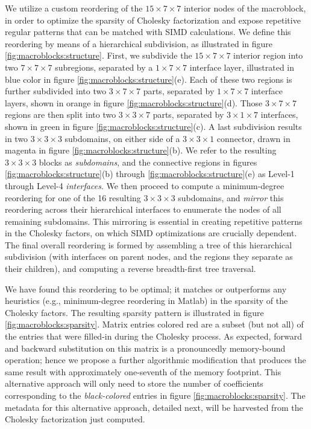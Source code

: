 We utilize a custom reordering of the $15\times 7\times 7$ interior
nodes of the macroblock, in order to optimize the sparsity of Cholesky
factorization and expose repetitive regular patterns that can be
matched with SIMD calculations. We define this reordering by means of
a hierarchical subdivision, as illustrated in figure
\ref{fig:macroblocks:structure}. First, we subdivide the $15\times 7\times 7$
interior region into two $7\times 7\times 7$ subregions, separated by
a $1\times 7\times 7$ interface layer, illustrated in blue color in
figure \ref{fig:macroblocks:structure}(e).  Each of these two regions is further
subdivided into two $3\times 7\times 7$ parts, separated by
$1\times 7\times 7$ interface layers, shown in orange in figure
\ref{fig:macroblocks:structure}(d).  Those $3\times 7\times 7$ regions are then
split into two $3\times 3\times 7$ parts, separated by
$3\times 1\times 7$ interfaces, shown in green in figure
\ref{fig:macroblocks:structure}(c).  A last subdivision results in two
$3\times 3\times 3$ subdomains, on either side of a
$3\times 3\times 1$ connector, drawn in magenta in figure
\ref{fig:macroblocks:structure}(b).  We refer to the resulting $3\times 3\times 3$
blocks as \emph{subdomains}, and the connective regions in figures
\ref{fig:macroblocks:structure}(b) through \ref{fig:macroblocks:structure}(e) as Level-1
through Level-4 \emph{interfaces}. We then proceed to compute a
minimum-degree reordering for one of the 16 resulting
$3\times 3\times 3$ subdomains, and \emph{mirror} this reordering
across their hierarchical interfaces to enumerate the nodes of all
remaining subdomains. This mirroring is essential in creating
repetitive patterns in the Cholesky factors, on which SIMD
optimizations are crucially dependent.  The final overall reordering
is formed by assembling a tree of this hierarchical subdivision (with
interfaces on parent nodes, and the regions they separate as their
children), and computing a reverse breadth-first tree traversal.

We have found this reordering to be optimal; it matches or outperforms
any heuristics (e.g., minimum-degree reordering in \textsf{Matlab}) in
the sparsity of the Cholesky factors. The resulting sparsity pattern
is illustrated in figure \ref{fig:macroblocks:sparsity}. Matrix
entries colored red are a subset (but not all) of the entries that
were filled-in during the Cholesky process. As expected, forward and
backward substitution on this matrix is a pronouncedly memory-bound
operation; hence we propose a further algorithmic modification that
produces the same result with approximately one-seventh of the memory
footprint. This alternative approach will only need to store the
number of coefficients corresponding to the \emph{black-colored}
entries in figure \ref{fig:macroblocks:sparsity}. The metadata for
this alternative approach, detailed next, will be harvested from the
Cholesky factorization just computed.

